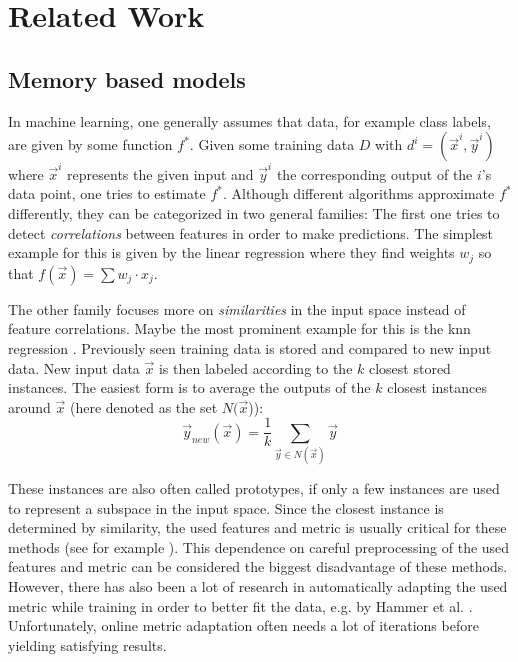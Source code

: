 \chapter{Related Work \label{chap:stateOfTheArt}}



\section{Memory based models}

In machine learning, one generally assumes that data, for example class labels, are given by some function $f^*$. Given some training data $D$ with $d^i =(\vec{x}^i,\vec{y}^i)$ where $\vec{x}^i$ represents the given input and $\vec{y}^i$ the corresponding output of the $i$'s data point, one tries to estimate $f^*$. 
Although different algorithms approximate $f^*$ differently, they can be categorized in two general families: The first one tries to detect \textit{correlations} between features in order to make predictions. The simplest example for this is given by the linear regression \cite{linearRegression} where they find weights $w_j$ so that $f(\vec{x}) = \sum w_j \cdot x_j$. 

The other family focuses more on \textit{similarities} in the input space instead of feature correlations. Maybe the most prominent example for this is the \gls{knn} regression \cite{kibler1987learning}. Previously seen training data is stored and compared to new input data. New input data $\vec{x}$ is then labeled according to the $k$ closest stored instances. The easiest form is to average the outputs of the $k$ closest instances around $\vec{x}$ (here denoted as the set $N(\vec{x}$)):
\begin{equation}
\vec{y}_{new}(\vec{x}) = \frac{1}{k} \sum_{\vec{y} \in N(\vec{x})} \vec{y}
\end{equation} %

These instances are also often called prototypes, if only a few instances are used to represent a subspace in the input space. Since the closest instance is determined by similarity, the used features and metric is usually critical for these methods (see for example \cite{metric1, metric2}). This dependence on careful preprocessing of the used features and metric can be considered the biggest disadvantage of these methods. However, there has also been a lot of research in automatically adapting the used metric while training in order to better fit the data, e.g. by Hammer et al. \cite{lvq}. Unfortunately, online metric adaptation often needs a lot of iterations before yielding satisfying results. 

